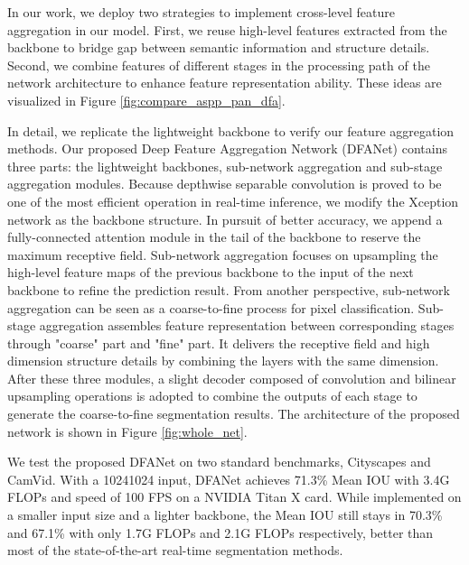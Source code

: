 \documentclass[10pt,twocolumn,letterpaper]{article}
\begin{document}
In our work, we deploy two strategies to implement cross-level feature aggregation in our model.
First, we reuse high-level features extracted from the backbone to bridge gap between semantic information and structure details.
Second, we combine features of different stages in the processing path of the network architecture to enhance feature representation ability. These ideas are visualized in Figure \ref{fig:compare_aspp_pan_dfa}.


In detail, we replicate the lightweight backbone to verify our feature aggregation methods. Our proposed Deep Feature Aggregation Network (DFANet) contains three parts: the lightweight backbones, sub-network aggregation and sub-stage aggregation modules. Because depthwise separable convolution is proved to be one of the most efficient operation in real-time inference, we modify the Xception network as the backbone structure. In pursuit of better accuracy, we append a fully-connected attention module in the tail of the backbone to reserve the maximum receptive field. 
Sub-network aggregation focuses on upsampling the high-level feature maps of the previous backbone to the input of the next backbone to refine the prediction result. From another perspective, sub-network aggregation can be seen as a coarse-to-fine process for pixel classification. 
Sub-stage aggregation assembles feature representation between corresponding stages through "coarse" part and "fine" part. It delivers the receptive field and high dimension structure details by combining the layers with the same dimension. After these three modules, a slight decoder composed of convolution and bilinear upsampling operations is adopted to combine the outputs of each stage to generate the coarse-to-fine segmentation results. The architecture of the proposed network is shown in Figure \ref{fig:whole_net}. 



We test the proposed DFANet on two standard benchmarks, Cityscapes and CamVid. 
With a 10241024 input, DFANet achieves 71.3\% Mean IOU with 3.4G FLOPs and speed of 100 FPS on a NVIDIA Titan X card. While implemented on a smaller input size and a lighter backbone, the Mean IOU still stays in 70.3\% and 67.1\% with only 1.7G FLOPs and 2.1G FLOPs respectively, better than most of the state-of-the-art real-time segmentation methods.
\end{document}
